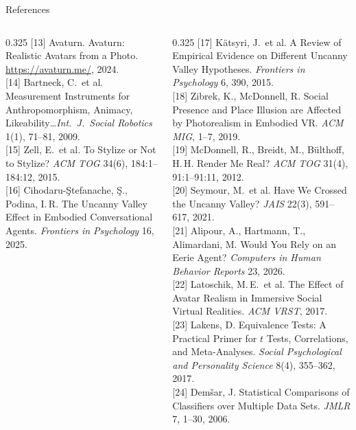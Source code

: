 \documentclass[aspectratio=169,10pt]{beamer}
\begin{document}
\begin{frame}{References}
\begin{columns}[T]
\begin{column}{0.325\textwidth}
      [13] Avaturn. Avaturn: Realistic Avatars from a Photo. \url{https://avaturn.me/}, 2024.\\[0.3em]
      [14] Bartneck, C.\ et al. Measurement Instruments for Anthropomorphism, Animacy, Likeability\ldots \textit{Int.\ J.\ Social Robotics} 1(1), 71--81, 2009.\\[0.3em]
      [15] Zell, E.\ et al. To Stylize or Not to Stylize? \textit{ACM TOG} 34(6), 184:1--184:12, 2015.\\[0.3em]
      [16] Cihodaru-\c{S}tefanache, \c{S}., Podina, I.\,R. The Uncanny Valley Effect in Embodied Conversational Agents. \textit{Frontiers in Psychology} 16, 2025.\\[0.3em]
    \end{column}
    \begin{column}{0.325\textwidth}
      [17] K\"atsyri, J.\ et al. A Review of Empirical Evidence on Different Uncanny Valley Hypotheses. \textit{Frontiers in Psychology} 6, 390, 2015.\\[0.3em]
      [18] Zibrek, K., McDonnell, R. Social Presence and Place Illusion are Affected by Photorealism in Embodied VR. \textit{ACM MIG}, 1--7, 2019.\\[0.3em]
      [19] McDonnell, R., Breidt, M., B\"ulthoff, H.\,H. Render Me Real? \textit{ACM TOG} 31(4), 91:1--91:11, 2012.\\[0.3em]
      [20] Seymour, M.\ et al. Have We Crossed the Uncanny Valley? \textit{JAIS} 22(3), 591--617, 2021.\\[0.3em]
      [21] Alipour, A., Hartmann, T., Alimardani, M. Would You Rely on an Eerie Agent? \textit{Computers in Human Behavior Reports} 23, 2026.\\[0.3em]
      [22] Latoschik, M.\,E.\ et al. The Effect of Avatar Realism in Immersive Social Virtual Realities. \textit{ACM VRST}, 2017.\\[0.3em]
      [23] Lakens, D. Equivalence Tests: A Practical Primer for $t$ Tests, Correlations, and Meta-Analyses. \textit{Social Psychological and Personality Science} 8(4), 355--362, 2017.\\[0.3em]
      [24] Dem\v{s}ar, J. Statistical Comparisons of Classifiers over Multiple Data Sets. \textit{JMLR} 7, 1--30, 2006.\\[0.3em]
    \end{column}
  \end{columns}
\end{frame}%
\end{document}
